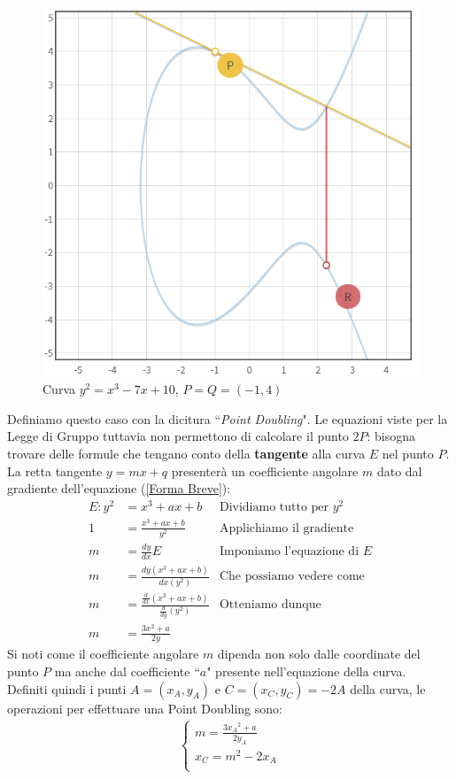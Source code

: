 \documentclass[a4paper,12pt]{tesiinfo}
\newcommand\ddfrac[2]{\frac{\displaystyle #1}{\displaystyle #2}}
\begin{document}
\begin{enumerate}
 \begin{figure}[H]
  \includegraphics[width=.6\textwidth,center]{PA_P+P}
  \caption{Curva $y^2 = x^3-7x+10$, $P=Q=(-1, 4)$}
 \end{figure}
 \label{PointDoubling}
Definiamo questo caso con la dicitura ``\textit{Point Doubling}". Le equazioni viste per la Legge di Gruppo tuttavia non permettono di calcolare il punto $2P$: bisogna trovare delle formule che tengano conto della \textbf{tangente} alla curva $E$ nel punto $P$. La retta tangente $y = mx+q$ presenter\`a un coefficiente angolare $m$ dato dal gradiente dell'equazione (\ref{Forma Breve}):
\begin{align*}
E : y^2 &= x^3 + ax + b &\text{Dividiamo tutto per $y^2$}\\
1 &= \ddfrac{x^3 + ax + b}{y^2} &\text{Applichiamo il gradiente}\\
m &= \ddfrac{dy}{dx}E &\text{Imponiamo l'equazione di $E$} \\
m &= \ddfrac{dy (x^3 + ax + b)}{dx (y^2)} &\text{Che possiamo vedere come}\\
m &= \ddfrac{\ddfrac{d}{dx}(x^3 + ax + b)}{\ddfrac{d}{dy}(y^2)} &\text{Otteniamo dunque}\\
m &= \ddfrac{3x^2 + a}{2y}
\end{align*}
Si noti come il coefficiente angolare $m$ dipenda non solo dalle coordinate del punto $P$ ma anche dal coefficiente ``$a$" presente nell'equazione della curva.
\\
Definiti quindi i punti $A = (x_A, y_A)$ e $C=(x_C, y_C) = -2A$ della curva, le operazioni per effettuare una Point Doubling sono:
\begin{gather}
\begin{cases}
m = \ddfrac{3{x_A}^2 + a}{2y_A}\\
x_C = m^2 - 2x_A\\

\end{cases}
\end{gather}
\end{enumerate}
\end{document}
